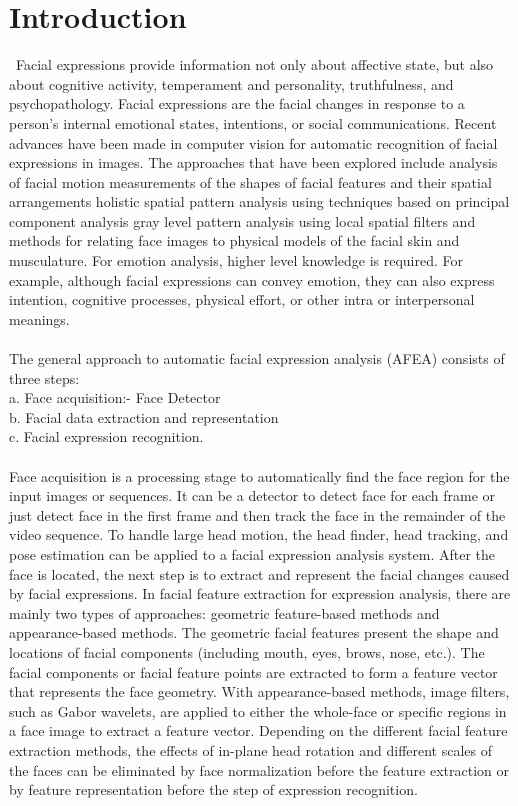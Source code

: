 \documentclass[journal]{IEEEtran}
\begin{document}
\section{Introduction}
\ Facial expressions provide information not only about affective state, but also about cognitive activity, temperament and personality, truthfulness, and psychopathology. Facial expressions are the facial changes in response to a person’s internal emotional states, intentions, or social communications. Recent advances have been made in computer vision for automatic recognition of facial expressions in images. The approaches that have been explored include analysis of facial motion measurements of the shapes of facial features and their spatial arrangements holistic spatial pattern analysis using techniques based on principal component analysis gray level pattern analysis using local spatial filters and methods for relating face images to physical models of the facial skin and musculature. For emotion analysis, higher level knowledge is required. For example, although facial expressions can convey emotion, they can also express intention, cognitive processes, physical effort, or other intra or interpersonal meanings. \\ \\
The general approach to automatic facial expression analysis (AFEA) consists of three steps:\\
a. Face acquisition:- Face Detector \\
b. Facial data extraction and representation \\
c. Facial expression recognition.\\ \\
Face acquisition is a processing stage to automatically find the face region for the input images or sequences. It can be a detector to detect face for each frame or just detect face in the first frame and then track the face in the remainder of the video sequence. To handle large head motion, the head finder, head tracking, and pose estimation can be applied to a facial expression analysis system. After the face is located, the next step is to extract and represent the facial changes caused by facial expressions. In facial feature extraction for expression analysis, there are mainly two types of approaches: geometric feature-based methods and appearance-based methods. The geometric facial features present the shape
and locations of facial components (including mouth, eyes, brows, nose, etc.). The facial components or facial feature points are extracted to form a feature vector that represents the face geometry. With appearance-based methods, image filters, such as Gabor wavelets, are applied to either the whole-face or specific regions in a face image to extract a feature vector. Depending on the different facial feature extraction methods, the effects of in-plane head rotation and different scales of the faces can be eliminated by face normalization before the feature extraction or by feature representation before the step of expression recognition.
\end{document}
